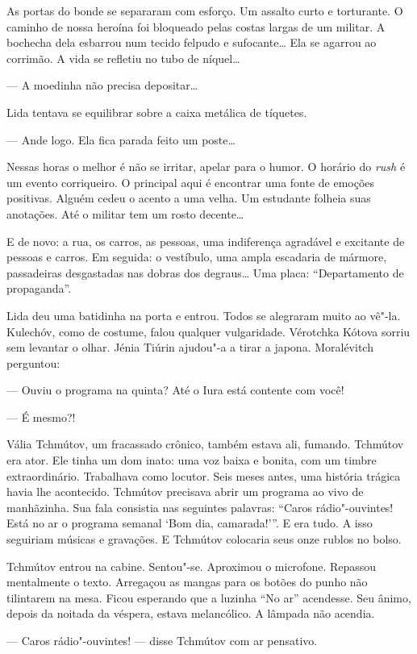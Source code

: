 As portas do bonde se separaram com esforço. Um assalto curto e
torturante. O caminho de nossa heroína foi bloqueado pelas costas largas
de um militar. A bochecha dela esbarrou num tecido felpudo e
sufocante\ldots{} Ela se agarrou ao corrimão. A vida se refletiu no tubo de
níquel\ldots{}

--- A moedinha não precisa depositar\ldots{}

Lida tentava se equilibrar sobre a caixa metálica de tíquetes.

--- Ande logo. Ela fica parada feito um poste\ldots{}

Nessas horas o melhor é não se irritar, apelar para o humor. O horário
do \emph{rush} é um evento corriqueiro. O principal aqui é encontrar uma
fonte de emoções positivas. Alguém cedeu o acento a uma velha. Um
estudante folheia suas anotações. Até o militar tem um rosto decente\ldots{}

E de novo: a rua, os carros, as pessoas, uma indiferença agradável e
excitante de pessoas e carros. Em seguida: o vestíbulo, uma ampla
escadaria de mármore, passadeiras desgastadas nas dobras dos degraus\ldots{}
Uma placa: ``Departamento de propaganda''.

Lida deu uma batidinha na porta e entrou. Todos se alegraram muito ao
vê"-la. Kulechóv, como de costume, falou qualquer vulgaridade. Vérotchka
Kótova sorriu sem levantar o olhar. Jénia Tiúrin ajudou"-a a tirar a
japona. Moralévitch perguntou:

--- Ouviu o programa na quinta? Até o Iura está contente com você!

--- É mesmo?!

Vália Tchmútov, um fracassado crônico, também estava ali, fumando.
Tchmútov era ator. Ele tinha um dom inato: uma voz baixa e bonita, com
um timbre extraordinário. Trabalhava como locutor. Seis meses antes, uma
história trágica havia lhe acontecido. Tchmútov precisava abrir um
programa ao vivo de manhãzinha. Sua fala consistia nas seguintes
palavras: ``Caros rádio"-ouvintes! Está no ar o programa semanal `Bom
dia, camarada!'''. E era tudo. A isso seguiriam músicas e
gravações. E Tchmútov colocaria seus onze rublos no bolso.

Tchmútov entrou na cabine. Sentou"-se. Aproximou o microfone. Repassou
mentalmente o texto. Arregaçou as mangas para os botões do punho não
tilintarem na mesa. Ficou esperando que a luzinha ``No ar'' acendesse.
Seu ânimo, depois da noitada da véspera, estava melancólico. A lâmpada
não acendia.

--- Caros rádio"-ouvintes! --- disse Tchmútov com ar pensativo.

